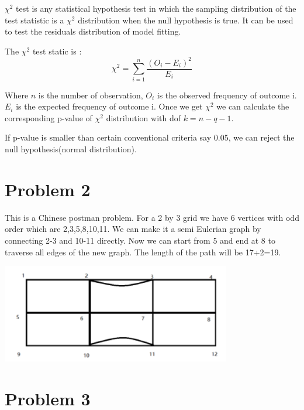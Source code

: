 \documentclass[12pt]{amsart}
\begin{document}
$\chi^2$ test is any statistical hypothesis test in which the sampling distribution of the test statistic is a $\chi^2$ distribution when the null hypothesis is true. It can be used to test the residuals distribution of model fitting.

The $\chi^2$ test static is :
\begin{equation*}
	\chi^2 = \sum_{i=1}^n \frac{(O_i - E_i)^2}{E_i}
\end{equation*}

Where $n$ is the number of observation, $O_i$ is the observed frequency of outcome i. $E_i$ is the expected frequency of outcome i. Once we get $\chi^2$ we can calculate the corresponding p-value of $\chi^2$ distribution with dof $k=n-q-1$.

If p-value is smaller than certain conventional criteria say 0.05, we can reject the null hypothesis(normal distribution).




\section{Problem 2}
This is a Chinese postman problem. For a 2 by 3 grid we have 6 vertices with odd order which are 2,3,5,8,10,11. We can make it a semi Eulerian graph by connecting 2-3 and 10-11 directly. Now we can start from 5 and end at 8 to traverse all edges of the new graph. The length of the path will be 17+2=19.

\begin{framed}
\includegraphics[width=10cm]{P2-tianmu.png}
\end{framed}




\section{Problem 3}
\end{document}
